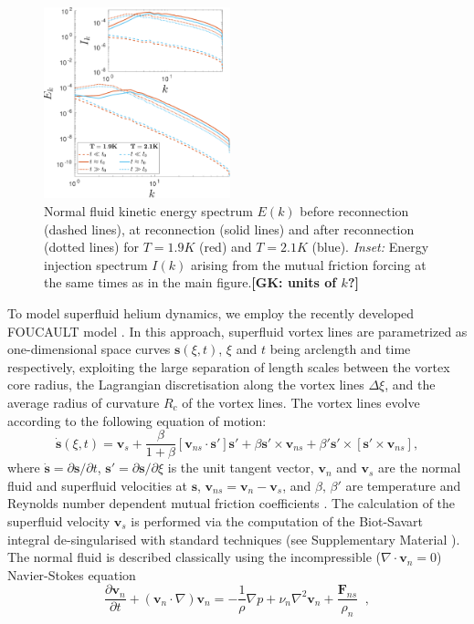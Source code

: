 \documentclass[%
 reprint,
 amsmath,amssymb,
 aps,
 prl,
]{revtex4-2}
\def \s{\mathbf{s}}
\def \v{\mathbf{v}}
\newcommand*{\NOTE}[1]{\textbf{\color{red}[#1]}}
\begin{document}
{\begin{figure}[b]
    \centering
    \includegraphics*[width=0.48\textwidth]{energy-spec.pdf}
    \caption{Normal fluid kinetic energy spectrum $E(k)$ before 
reconnection (dashed lines), at reconnection (solid lines) 
and after reconnection (dotted lines) for $T=1.9K$ (red)
and $T=2.1K$ (blue). 
\emph{Inset:} Energy injection spectrum $I(k)$ arising from the 
mutual friction forcing at the same times as in the main figure.\NOTE{GK: units of $k$?}}
    \label{fig:kinetic-energy}
\end{figure}

To model superfluid helium dynamics, we employ the recently developed FOUCAULT model
\cite{galantucciNewSelfconsistentApproach2020b}.  In this approach, superfluid vortex lines are
parametrized as one-dimensional space curves  $\s(\xi,t)$, $\xi$ and $t$ being arclength and time respectively, exploiting the large separation of length scales between the vortex core radius, the Lagrangian discretisation along the vortex lines $\Delta\xi$, and the average radius of curvature $R_c$ of the vortex lines. The vortex lines evolve according to the following equation of motion:
\begin{equation}
    \dot{\s}(\xi,t) = \v_s + \frac{\beta}{1+\beta}\left[\v_{ns}\cdot\s'\right]\s' + \beta\s'\times\v_{ns} + \beta'\s'\times\left[\s'\times\v_{ns}\right],
\end{equation}
where $\dot{\s} = \partial\s/\partial t$, $\s' = \partial\s/\partial\xi$ is the unit tangent vector, $\v_n$ and $\v_s$ are the normal fluid and superfluid velocities at $\s$, $\v_{ns} = \v_n-\v_s$, and $\beta,\, \beta'$ are temperature and Reynolds number dependent mutual friction coefficients \cite{galantucciNewSelfconsistentApproach2020b}. The calculation of the superfluid velocity $\v_s$ is performed via the computation of the Biot-Savart integral de-singularised with standard techniques (see Supplementary Material \cite{suppMat}). The normal fluid is described classically using the incompressible ($\nabla\cdot\v_n=0$) 
Navier-Stokes equation
\begin{equation}
    \frac{\partial\v_n}{\partial t} + (\v_n\cdot\nabla)\v_n = -\frac{1}{\rho}\nabla p  + \nu_n\nabla^2\v_n + \frac{\mathbf{F}_{ns}}{\rho_n} \; \; , 
\end{equation}

}
\end{document}
